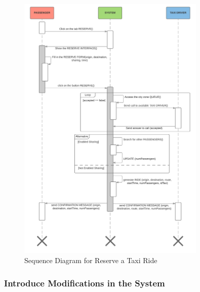 \begin{figure}[htbp]
\centering
\includegraphics[width=0.8\textwidth]{cpt/img/SequenceReserve}
\caption{Sequence Diagram for Reserve a Taxi Ride}
\end{figure}
\clearpage

\subsubsection{Introduce Modifications in the System}

